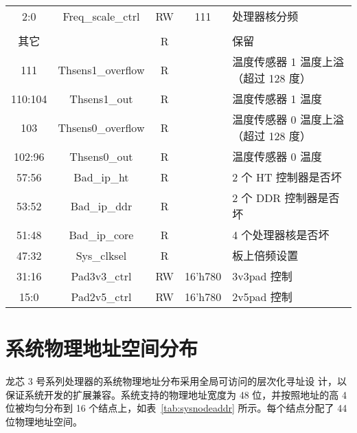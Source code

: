 \begin{longtable}{|c|c|c|c|p{6.5cm}|}
    2:0     & Freq\_scale\_ctrl        & RW & 111   & 处理器核分频                                                \\* \hhline
    \multicolumn{5}{|l|}{芯片采样寄存器（物理地址 0x1fe00190）} \\* \hline
    其它    &                          & R  &          & 保留                                                        \\ \hline
    111     & Thsens1\_overflow        & R  &          & 温度传感器 1 温度上溢（超过 128 度）                        \\ \hline
    110:104 & Thsens1\_out             & R  &          & 温度传感器 1 温度                                           \\ \hline
    103     & Thsens0\_overflow        & R  &          & 温度传感器 0 温度上溢（超过 128 度）                        \\ \hline
    102:96  & Thsens0\_out             & R  &          & 温度传感器 0 温度                                           \\ \hline
    57:56   & Bad\_ip\_ht              & R  &          & 2 个 HT 控制器是否坏                                        \\ \hline
    53:52   & Bad\_ip\_ddr             & R  &          & 2 个 DDR 控制器是否坏                                       \\ \hline
    51:48   & Bad\_ip\_core            & R  &          & 4 个处理器核是否坏                                          \\ \hline
    47:32   & Sys\_clksel              & R  &          & 板上倍频设置                                                \\ \hline
    31:16   & Pad3v3\_ctrl             & RW & 16'h780  & 3v3pad 控制                                                 \\ \hline
    15:0    & Pad2v5\_ctrl             & RW & 16'h780  & 2v5pad 控制                                                 \\ \hline
\end{longtable}

\section{系统物理地址空间分布}

龙芯 3 号系列处理器的系统物理地址分布采用全局可访问的层次化寻址设
计，以保证系统开发的扩展兼容。系统支持的物理地址宽度为 48 位，并按照地址的高 4
位被均匀分布到 16 个结点上，如表~\ref{tab:sysnodeaddr} 所示。每个结点分配了
44 位物理地址空间。

